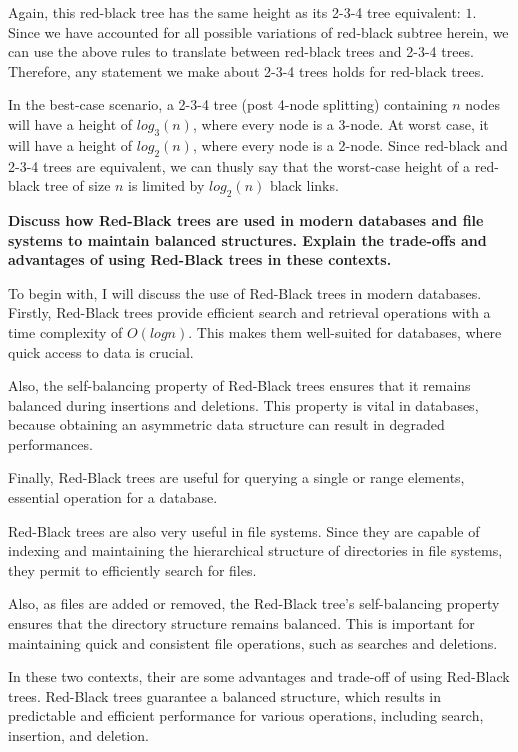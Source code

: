\documentclass[12pt]{amsart}
\begin{document}
    Again, this red-black tree has the same height as its 2-3-4
    tree equivalent: $1$. Since we have accounted for all
    possible variations of red-black subtree herein, we can use
    the above rules to translate between red-black trees and
    2-3-4 trees. Therefore, any statement we make about 2-3-4
    trees holds for red-black trees.

    In the best-case scenario, a 2-3-4 tree (post 4-node
    splitting) containing $n$ nodes will have a height of
    $log_3(n)$, where every node is a 3-node. At worst case, it
    will have a height of $log_2(n)$, where every node is a
    2-node. Since red-black and 2-3-4 trees are equivalent, we
    can thusly say that the worst-case height of a red-black
    tree of size $n$ is limited by $log_2(n)$ black links.

    \newpage
    \textbf{Discuss how Red-Black trees are used in modern
    databases and file systems to maintain balanced structures.
    Explain the trade-offs and advantages of using Red-Black
    trees in these contexts.}

    To begin with, I will discuss the use of Red-Black trees in
    modern databases. Firstly, Red-Black trees provide efficient
    search and retrieval operations with a time complexity of
    $O(log n)$. This makes them well-suited for databases, where
    quick access to data is crucial.
    
    Also, the self-balancing property of Red-Black trees ensures
    that it remains balanced during insertions and deletions.
    This property is vital in databases, because obtaining an
    asymmetric data structure can result in degraded
    performances.
    
    Finally, Red-Black trees are useful for querying a single or
    range elements, essential operation for a database.
    
    
    Red-Black trees are also very useful in file systems.
    Since they are capable of indexing and maintaining the
    hierarchical structure of directories in file systems, they
    permit to efficiently search for files.
    
    Also, as files are added or removed, the Red-Black tree's
    self-balancing property ensures that the directory structure
    remains balanced. This is important for maintaining quick
    and consistent file operations, such as searches and
    deletions.
    
    
    In these two contexts, their are some advantages and
    trade-off of using Red-Black trees. Red-Black trees
    guarantee a balanced structure, which results in predictable
    and efficient performance for various operations, including
    search, insertion, and deletion.
    
\end{document}
